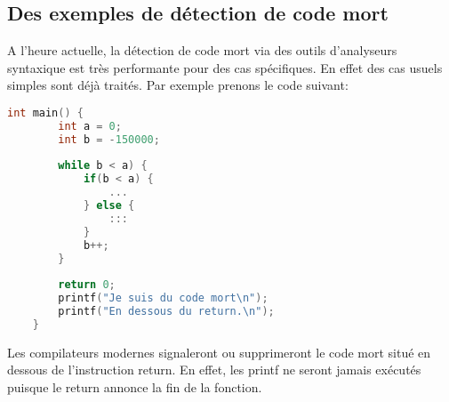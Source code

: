 \subsection{Des exemples de détection de code mort}
A l'heure actuelle, la détection de code mort via des outils d'analyseurs syntaxique est très performante pour des cas spécifiques. En effet des cas usuels simples sont déjà traités. Par exemple prenons le code suivant:
\begin{lstlisting}[language=c, xleftmargin=.25\textwidth, caption={Exemple de programme avec du code mort}, captionpos=b]
    int main() {
        int a = 0;
        int b = -150000;
        
        while b < a) {
            if(b < a) {
                ...
            } else {
                :::
            }
            b++;
        }
    
        return 0;
        printf("Je suis du code mort\n");
        printf("En dessous du return.\n");
    }
\end{lstlisting}

Les compilateurs modernes signaleront ou supprimeront le code mort situé en dessous de l'instruction return. En effet, les printf ne seront jamais exécutés puisque le return annonce la fin de la fonction.

